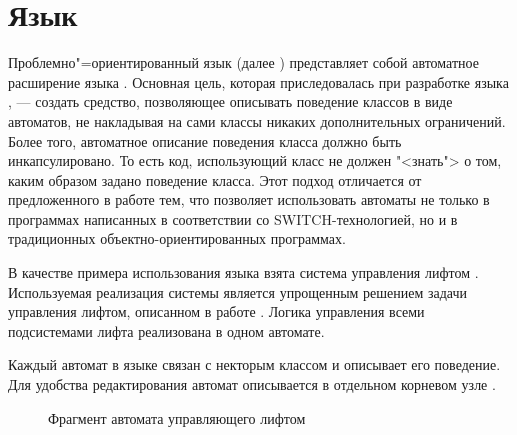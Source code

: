 \section{Язык }
Проблемно"=ориентированный язык  (далее )
представляет собой автоматное расширение языка . Основная цель, которая приследовалась при разработке
языка , --- создать средство, позволяющее описывать поведение классов в виде автоматов, не накладывая на
сами классы никаких дополнительных ограничений. Более того, автоматное описание поведения класса должно быть
инкапсулировано. То есть код, использующий класс не должен "<знать"> о том, каким образом задано поведение класса. Этот
подход отличается от предложенного в работе \cite{myUMLSwitchEclipse} тем, что позволяет использовать автоматы не только в
программах написанных в соответствии со SWITCH-технологией, но и в традиционных объектно-ориентированных программах.

В качестве примера использования языка  взята система управления лифтом \cite{knuth}. Используемая
реализация системы является упрощенным решением задачи управления лифтом, описанном в работе \cite{naumov}. Логика
управления всеми подсистемами лифта реализована в одном автомате.

Каждый автомат в языке  связан с некторым классом и описывает его поведение. Для удобства редактирования
автомат описывается в отдельном корневом узле \pic{\ref{fig:ElevatorStateMachine}}.

\begin{figure}
 \centering
 \caption{Фрагмент автомата управляющего лифтом}
 \label{fig:ElevatorStateMachine}
\end{figure}

